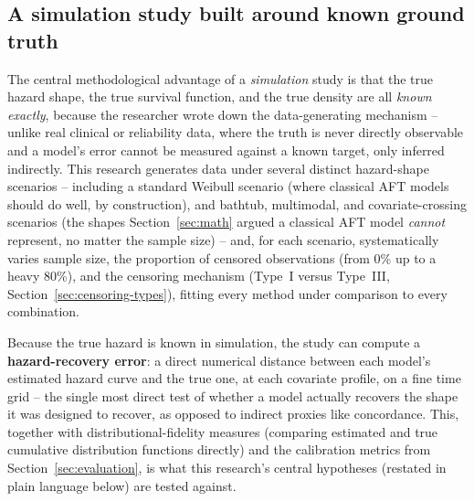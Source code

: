 \documentclass[11pt]{article}
\begin{document}
\subsection{A simulation study built around known ground truth}
The central methodological advantage of a \emph{simulation} study is that
the true hazard shape, the true survival function, and the true density
are all \emph{known exactly}, because the researcher wrote down the
data-generating mechanism -- unlike real clinical or reliability data,
where the truth is never directly observable and a model's error cannot
be measured against a known target, only inferred indirectly. This
research generates data under several distinct hazard-shape scenarios --
including a standard Weibull scenario (where classical AFT models should
do well, by construction), and bathtub, multimodal, and covariate-crossing
scenarios (the shapes Section~\ref{sec:math} argued a classical AFT model
\emph{cannot} represent, no matter the sample size) -- and, for each
scenario, systematically varies sample size, the proportion of censored
observations (from 0\% up to a heavy 80\%), and the censoring mechanism
(Type~I versus Type~III, Section~\ref{sec:censoring-types}), fitting
every method under comparison to every combination.

Because the true hazard is known in simulation, the study can compute a
\textbf{hazard-recovery error}: a direct numerical distance between each
model's estimated hazard curve and the true one, at each covariate
profile, on a fine time grid -- the single most direct test of whether a
model actually recovers the shape it was designed to recover, as opposed
to indirect proxies like concordance. This, together with
distributional-fidelity measures (comparing estimated and true cumulative
distribution functions directly) and the calibration metrics from
Section~\ref{sec:evaluation}, is what this research's central hypotheses
(restated in plain language below) are tested against.
\end{document}
